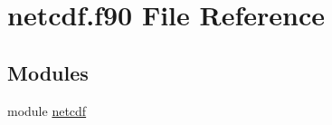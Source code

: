 \hypertarget{netcdf_8f90}{}\section{netcdf.\+f90 File Reference}
\label{netcdf_8f90}
\subsection*{Modules}
\begin{DoxyCompactItemize}
\item 
module \hyperlink{namespacenetcdf}{netcdf}
\end{DoxyCompactItemize}
